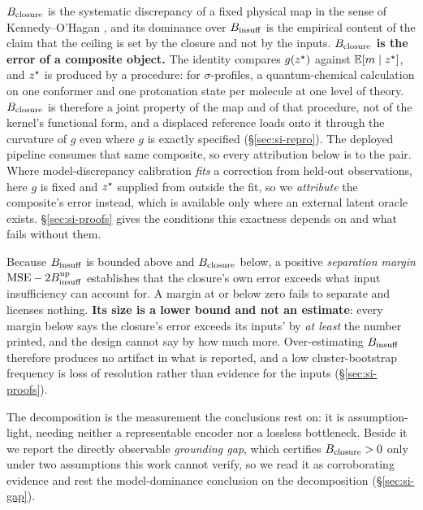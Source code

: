 \noindent $B_{\mathrm{closure}}$ is the systematic discrepancy of a fixed physical map in the sense of
Kennedy--O'Hagan \cite{kennedy2001,brynjarsdottir2014}, and its dominance over $B_{\mathrm{insuff}}$ is the
empirical content of the claim that the ceiling is set by the closure and not by the inputs.
\textbf{$B_{\mathrm{closure}}$ is the error of a composite object.} The identity compares $g(z^\star)$
against $\mathbb{E}[m\mid z^\star]$, and $z^\star$ is produced by a procedure: for $\sigma$-profiles, a
quantum-chemical calculation on one conformer and one protonation state per molecule at one level of
theory. $B_{\mathrm{closure}}$ is therefore a joint property of the map and of that procedure, not of the kernel's
functional form, and a displaced reference loads onto it through the curvature of $g$ even where $g$
is exactly specified (\S\ref{sec:si-repro}). The deployed pipeline consumes that same composite, so
every attribution below is to the pair. Where model-discrepancy calibration \emph{fits} a correction
from held-out observations, here $g$ is fixed and $z^\star$ supplied from outside the fit, so we
\emph{attribute} the composite's error instead, which is available only where an external latent
oracle exists. %
\S\ref{sec:si-proofs} gives the conditions this exactness depends on and what fails without them.

Because $B_{\mathrm{insuff}}$ is bounded above and $B_{\mathrm{closure}}$ below, a positive \emph{separation margin}
$\mathrm{MSE}-2B_{\mathrm{insuff}}^{\mathrm{up}}$ establishes that the closure's own error exceeds what input
insufficiency can account for. A margin at or below zero fails to separate and licenses nothing.
\textbf{Its size is a lower bound and not an estimate}: every margin below says the closure's error
exceeds its inputs' by \emph{at least} the number printed, and the design cannot say by how much
more. Over-estimating $B_{\mathrm{insuff}}$ therefore produces no artifact in what is reported, and a low
cluster-bootstrap frequency is loss of resolution rather than evidence for the inputs
(\S\ref{sec:si-proofs}).

The decomposition is the measurement the conclusions rest on: it is assumption-light, needing
neither a representable encoder nor a lossless bottleneck. Beside it we report the directly
observable \emph{grounding gap}, which certifies $B_{\mathrm{closure}}>0$ only under two assumptions this work
cannot verify, so we read it as corroborating evidence and rest the model-dominance conclusion on
the decomposition (\S\ref{sec:si-gap}).

